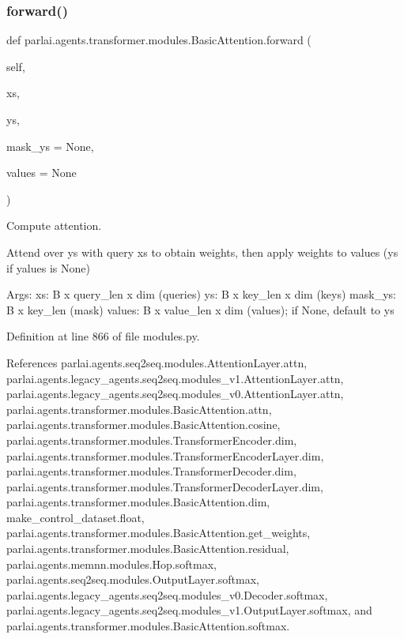 \subsubsection{\texorpdfstring{forward()}{forward()}}
{\footnotesize\ttfamily def parlai.\+agents.\+transformer.\+modules.\+Basic\+Attention.\+forward (\begin{DoxyParamCaption}\item[{}]{self,  }\item[{}]{xs,  }\item[{}]{ys,  }\item[{}]{mask\+\_\+ys = {\ttfamily None},  }\item[{}]{values = {\ttfamily None} }\end{DoxyParamCaption})}

\begin{DoxyVerb}Compute attention.

Attend over ys with query xs to obtain weights, then apply weights to
values (ys if yalues is None)

Args:
    xs: B x query_len x dim (queries)
    ys: B x key_len x dim (keys)
    mask_ys: B x key_len (mask)
    values: B x value_len x dim (values); if None, default to ys
\end{DoxyVerb}
 

Definition at line 866 of file modules.\+py.



References parlai.\+agents.\+seq2seq.\+modules.\+Attention\+Layer.\+attn, parlai.\+agents.\+legacy\+\_\+agents.\+seq2seq.\+modules\+\_\+v1.\+Attention\+Layer.\+attn, parlai.\+agents.\+legacy\+\_\+agents.\+seq2seq.\+modules\+\_\+v0.\+Attention\+Layer.\+attn, parlai.\+agents.\+transformer.\+modules.\+Basic\+Attention.\+attn, parlai.\+agents.\+transformer.\+modules.\+Basic\+Attention.\+cosine, parlai.\+agents.\+transformer.\+modules.\+Transformer\+Encoder.\+dim, parlai.\+agents.\+transformer.\+modules.\+Transformer\+Encoder\+Layer.\+dim, parlai.\+agents.\+transformer.\+modules.\+Transformer\+Decoder.\+dim, parlai.\+agents.\+transformer.\+modules.\+Transformer\+Decoder\+Layer.\+dim, parlai.\+agents.\+transformer.\+modules.\+Basic\+Attention.\+dim, make\+\_\+control\+\_\+dataset.\+float, parlai.\+agents.\+transformer.\+modules.\+Basic\+Attention.\+get\+\_\+weights, parlai.\+agents.\+transformer.\+modules.\+Basic\+Attention.\+residual, parlai.\+agents.\+memnn.\+modules.\+Hop.\+softmax, parlai.\+agents.\+seq2seq.\+modules.\+Output\+Layer.\+softmax, parlai.\+agents.\+legacy\+\_\+agents.\+seq2seq.\+modules\+\_\+v0.\+Decoder.\+softmax, parlai.\+agents.\+legacy\+\_\+agents.\+seq2seq.\+modules\+\_\+v1.\+Output\+Layer.\+softmax, and parlai.\+agents.\+transformer.\+modules.\+Basic\+Attention.\+softmax.



